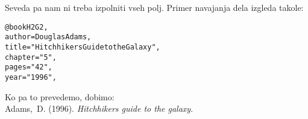 \documentclass[a4paper]{book}
\begin{document}
Seveda pa nam ni treba izpolniti vseh polj. Primer navajanja dela izgleda takole:

\begin{alltt}

@book {H2G2,
  author = {Douglas Adams},
  title = "Hitchhikers Guide to the Galaxy",
  chapter = "5",
  pages = "42",
  year = "1996",
}

\end{alltt}

Ko pa to prevedemo, dobimo:\\

\noindent{}Adams,~D. (1996). \textit{Hitchhikers guide to the galaxy}.


\end{document}
